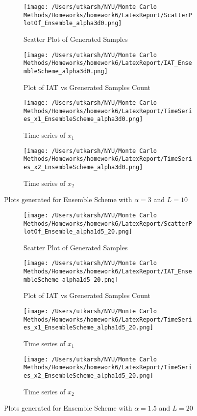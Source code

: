\documentclass[11pt]{article}
\begin{document}
\begin{figure}[H]
	\centering
	\begin{subfigure}{.22\textwidth}
		\texttt{[image: /Users/utkarsh/NYU/Monte Carlo Methods/Homeworks/homework6/LatexReport/ScatterPlotOf\_Ensemble\_alpha3d0.png]}
		\caption{Scatter Plot of Generated Samples}
		\label{fig:en_3_scatter}
	\end{subfigure}
	\begin{subfigure}{.22\textwidth}
		\texttt{[image: /Users/utkarsh/NYU/Monte Carlo Methods/Homeworks/homework6/LatexReport/IAT\_EnsembleScheme\_alpha3d0.png]}
		\caption{Plot of IAT vs Grenerated Samples Count}
		\label{fig:en_3_iat}
	\end{subfigure}
	\begin{subfigure}{.22\textwidth}
		\texttt{[image: /Users/utkarsh/NYU/Monte Carlo Methods/Homeworks/homework6/LatexReport/TimeSeries\_x1\_EnsembleScheme\_alpha3d0.png]}
		\caption{Time series of $x_1$}
		\label{fig:en_3_time_x1}
	\end{subfigure}
	\begin{subfigure}{.22\textwidth}
		\texttt{[image: /Users/utkarsh/NYU/Monte Carlo Methods/Homeworks/homework6/LatexReport/TimeSeries\_x2\_EnsembleScheme\_alpha3d0.png]}
		\caption{Time series of $x_2$}
		\label{fig:en_3_time_x2}
	\end{subfigure}
	\caption{Plots generated for Ensemble Scheme with $\alpha = 3$ and $L = 10$}
	\label{fig:en_3_plots}
\end{figure}



\begin{figure}[H]
	\centering
	\begin{subfigure}{.22\textwidth}
		\texttt{[image: /Users/utkarsh/NYU/Monte Carlo Methods/Homeworks/homework6/LatexReport/ScatterPlotOf\_Ensemble\_alpha1d5\_20.png]}
		\caption{Scatter Plot of Generated Samples}
		\label{fig:en_1.5_scatter_20}
	\end{subfigure}
	\begin{subfigure}{.22\textwidth}
		\texttt{[image: /Users/utkarsh/NYU/Monte Carlo Methods/Homeworks/homework6/LatexReport/IAT\_EnsembleScheme\_alpha1d5\_20.png]}
		\caption{Plot of IAT vs Grenerated Samples Count}
		\label{fig:en_1.5_iat_20}
	\end{subfigure}
	\begin{subfigure}{.22\textwidth}
		\texttt{[image: /Users/utkarsh/NYU/Monte Carlo Methods/Homeworks/homework6/LatexReport/TimeSeries\_x1\_EnsembleScheme\_alpha1d5\_20.png]}
		\caption{Time series of $x_1$}
		\label{fig:en_1.5_time_x1_20}
	\end{subfigure}
	\begin{subfigure}{.22\textwidth}
		\texttt{[image: /Users/utkarsh/NYU/Monte Carlo Methods/Homeworks/homework6/LatexReport/TimeSeries\_x2\_EnsembleScheme\_alpha1d5\_20.png]}
		\caption{Time series of $x_2$}
		\label{fig:en_1.5_time_x2_20}
	\end{subfigure}
	\caption{Plots generated for Ensemble Scheme with $\alpha = 1.5$ and $L = 20$}
	\label{fig:en_1.5_plots}
\end{figure}
\end{document}
